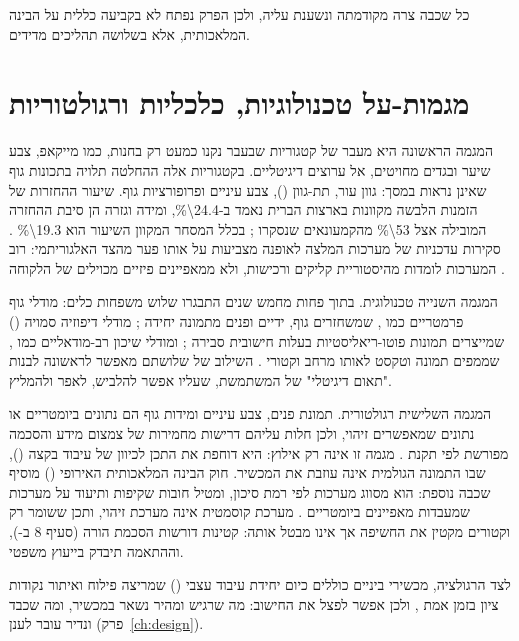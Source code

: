 כל שכבה צרה מקודמתה ונשענת עליה, ולכן הפרק נפתח לא בקביעה כללית על הבינה המלאכותית, אלא בשלושה תהליכים מדידים.

\section{מגמות-על טכנולוגיות, כלכליות ורגולטוריות}
\label{sec:trends}

המגמה הראשונה היא מעבר של קטגוריות שבעבר נקנו כמעט רק בחנות, כמו מייקאפ, צבע שיער ובגדים מחויטים, אל ערוצים דיגיטליים. בקטגוריות אלה ההחלטה תלויה בתכונות גוף שאינן נראות במסך: גוון עור, תת-גוון (), צבע עיניים ופרופורציות גוף. שיעור ההחזרות של הזמנות הלבשה מקוונות בארצות הברית נאמד ב-\num{24.4\%}, ומידה וגזרה הן סיבת ההחזרה המובילה אצל \num{53\%} מהקמעונאים שנסקרו \cite{coresight2023returns}; בכלל המסחר המקוון השיעור הוא \num{19.3\%} \cite{nrf2025returns}. סקירות עדכניות של מערכות המלצה לאופנה מצביעות על אותו פער מהצד האלגוריתמי: רוב המערכות לומדות מהיסטוריית קליקים ורכישות, ולא ממאפיינים פיזיים מכוילים של הלקוחה \cite{deldjoo2023fashionrec}.

המגמה השנייה טכנולוגית. בתוך פחות מחמש שנים התבגרו שלוש משפחות כלים: מודלי גוף פרמטריים כמו , שמשחזרים גוף, ידיים ופנים מתמונה יחידה \cite{pavlakos2019smplx,goel2023hmr2}; מודלי דיפוזיה סמויה () שמייצרים תמונות פוטו-ריאליסטיות בעלות חישובית סבירה \cite{rombach2022ldm}; ומודלי שיכון רב-מודאליים כמו , שממפים תמונה וטקסט לאותו מרחב וקטורי \cite{radford2021clip}. השילוב של שלושתם מאפשר לראשונה לבנות "תאום דיגיטלי" של המשתמשת, שעליו אפשר להלביש, לאפר ולהמליץ.

המגמה השלישית רגולטורית. תמונת פנים, צבע עיניים ומידות גוף הם נתונים ביומטריים או נתונים שמאפשרים זיהוי, ולכן חלות עליהם דרישות מחמירות של צמצום מידע והסכמה מפורשת לפי תקנת  \cite{gdpr2016}. מגמה זו אינה רק אילוץ: היא דוחפת את התכן לכיוון של עיבוד בקצה (), שבו התמונה הגולמית אינה עוזבת את המכשיר. חוק הבינה המלאכותית האירופי () מוסיף שכבה נוספת: הוא מסווג מערכות לפי רמת סיכון, ומטיל חובות שקיפות ותיעוד על מערכות שמעבדות מאפיינים ביומטריים \cite{euaiact2024}. מערכת קוסמטית אינה מערכת זיהוי, ותכן ששומר רק וקטורים מקטין את החשיפה אך אינו מבטל אותה: קטינות דורשות הסכמת הורה (סעיף \num{8} ב-), וההתאמה תיבדק בייעוץ משפטי.

לצד הרגולציה, מכשירי ביניים כוללים כיום יחידת עיבוד עצבי () שמריצה פילוח ואיתור נקודות ציון בזמן אמת \cite{zhang2020mediapipe}, ולכן אפשר לפצל את החישוב: מה שרגיש ומהיר נשאר במכשיר, ומה שכבד ונדיר עובר לענן (פרק~\ref{ch:design}).

